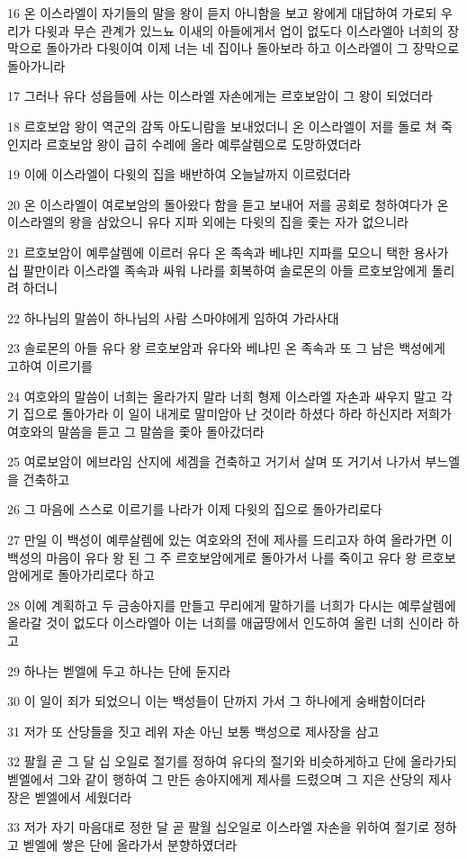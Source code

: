 \par 16 온 이스라엘이 자기들의 말을 왕이 듣지 아니함을 보고 왕에게 대답하여 가로되 우리가 다윗과 무슨 관계가 있느뇨 이새의 아들에게서 업이 없도다 이스라엘아 너희의 장막으로 돌아가라 다윗이여 이제 너는 네 집이나 돌아보라 하고 이스라엘이 그 장막으로 돌아가니라
\par 17 그러나 유다 성읍들에 사는 이스라엘 자손에게는 르호보암이 그 왕이 되었더라
\par 18 르호보암 왕이 역군의 감독 아도니람을 보내었더니 온 이스라엘이 저를 돌로 쳐 죽인지라 르호보암 왕이 급히 수레에 올라 예루살렘으로 도망하였더라
\par 19 이에 이스라엘이 다윗의 집을 배반하여 오늘날까지 이르렀더라
\par 20 온 이스라엘이 여로보암의 돌아왔다 함을 듣고 보내어 저를 공회로 청하여다가 온 이스라엘의 왕을 삼았으니 유다 지파 외에는 다윗의 집을 좇는 자가 없으니라
\par 21 르호보암이 예루살렘에 이르러 유다 온 족속과 베냐민 지파를 모으니 택한 용사가 십 팔만이라 이스라엘 족속과 싸워 나라를 회복하여 솔로몬의 아들 르호보암에게 돌리려 하더니
\par 22 하나님의 말씀이 하나님의 사람 스마야에게 임하여 가라사대
\par 23 솔로몬의 아들 유다 왕 르호보암과 유다와 베냐민 온 족속과 또 그 남은 백성에게 고하여 이르기를
\par 24 여호와의 말씀이 너희는 올라가지 말라 너희 형제 이스라엘 자손과 싸우지 말고 각기 집으로 돌아가라 이 일이 내게로 말미암아 난 것이라 하셨다 하라 하신지라 저희가 여호와의 말씀을 듣고 그 말씀을 좇아 돌아갔더라
\par 25 여로보암이 에브라임 산지에 세겜을 건축하고 거기서 살며 또 거기서 나가서 부느엘을 건축하고
\par 26 그 마음에 스스로 이르기를 나라가 이제 다윗의 집으로 돌아가리로다
\par 27 만일 이 백성이 예루살렘에 있는 여호와의 전에 제사를 드리고자 하여 올라가면 이 백성의 마음이 유다 왕 된 그 주 르호보암에게로 돌아가서 나를 죽이고 유다 왕 르호보암에게로 돌아가리로다 하고
\par 28 이에 계획하고 두 금송아지를 만들고 무리에게 말하기를 너희가 다시는 예루살렘에 올라갈 것이 없도다 이스라엘아 이는 너희를 애굽땅에서 인도하여 올린 너희 신이라 하고
\par 29 하나는 벧엘에 두고 하나는 단에 둔지라
\par 30 이 일이 죄가 되었으니 이는 백성들이 단까지 가서 그 하나에게 숭배함이더라
\par 31 저가 또 산당들을 짓고 레위 자손 아닌 보통 백성으로 제사장을 삼고
\par 32 팔월 곧 그 달 십 오일로 절기를 정하여 유다의 절기와 비슷하게하고 단에 올라가되 벧엘에서 그와 같이 행하여 그 만든 송아지에게 제사를 드렸으며 그 지은 산당의 제사장은 벧엘에서 세웠더라
\par 33 저가 자기 마음대로 정한 달 곧 팔월 십오일로 이스라엘 자손을 위하여 절기로 정하고 벧엘에 쌓은 단에 올라가서 분향하였더라

